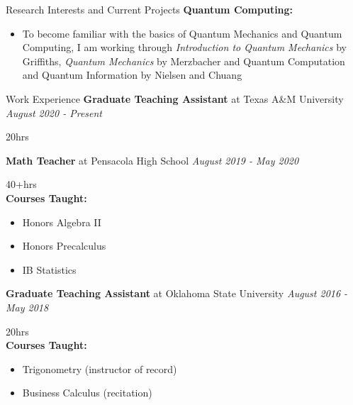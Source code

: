 \documentclass{resume} %
\begin{document}
\begin{rSection}{Research Interests and Current Projects}
{\bf Quantum Computing:}
\begin{itemize}
\item To become familiar with the basics of Quantum Mechanics and Quantum Computing, I am working through \textit{Introduction to Quantum Mechanics} by Griffiths, \textit{Quantum Mechanics} by Merzbacher and {Quantum Computation and Quantum Information} by Nielsen and Chuang
\end{itemize}


\end{rSection}

\newpage


\begin{rSection}{Work Experience} 
{\bf Graduate Teaching Assistant } at Texas A\&M University \hfill {\em August 2020 - Present}\\
\strut\hfill{20hrs}
\vspace{2mm}

{\bf Math Teacher} at Pensacola High School \hfill {\em August 2019 - May 2020}\\
\strut\hfill{40+hrs}\\
{\bf Courses Taught:} 
\begin{itemize}
\item Honors Algebra II
\item Honors Precalculus 
\item IB Statistics
\end{itemize} 
\vspace{2mm}

{\bf Graduate Teaching Assistant} at Oklahoma State University \hfill {\em August 2016 - May 2018} \\
\strut\hfill{20hrs}\\
{\bf Courses Taught:} 
\begin{itemize}
\item Trigonometry (instructor of record)
\item Business Calculus (recitation)
\end{itemize} 

\end{rSection}
\end{document}
